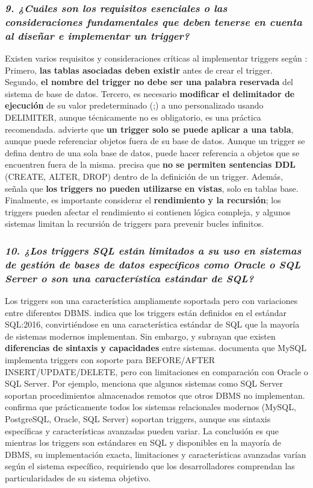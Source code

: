 \subsubsection*{\textit{9. ¿Cuáles son los requisitos esenciales o las consideraciones fundamentales que deben tenerse en cuenta al diseñar e implementar un trigger?}}

Existen varios requisitos y consideraciones críticas al implementar triggers según \parencite{Bosco2020}: Primero, \textbf{las tablas asociadas deben existir} antes de crear el trigger. Segundo, \textbf{el nombre del trigger no debe ser una palabra reservada} del sistema de base de datos. Tercero, es necesario \textbf{modificar el delimitador de ejecución} de su valor predeterminado (;) a uno personalizado usando DELIMITER, aunque técnicamente no es obligatorio, es una práctica recomendada. \parencite{Base100} advierte que \textbf{un trigger solo se puede aplicar a una tabla}, aunque puede referenciar objetos fuera de su base de datos. Aunque un trigger se defina dentro de una sola base de datos, puede hacer referencia a objetos que se encuentren fuera de la misma. \parencite{MySQLDocumentation} precisa que \textbf{no se permiten sentencias DDL} (CREATE, ALTER, DROP) dentro de la definición de un trigger. Además, \parencite{Bosco2020} señala que \textbf{los triggers no pueden utilizarse en vistas}, solo en tablas base. Finalmente, es importante considerar el \textbf{rendimiento y la recursión}; los triggers pueden afectar el rendimiento si contienen lógica compleja, y algunos sistemas limitan la recursión de triggers para prevenir bucles infinitos.

\subsubsection*{\textit{10. ¿Los triggers SQL están limitados a su uso en sistemas de gestión de bases de datos específicos como Oracle o SQL Server o son una característica estándar de SQL?}}

Los triggers son una característica ampliamente soportada pero con variaciones entre diferentes DBMS. \parencite{SQLStandard} indica que los triggers están definidos en el estándar SQL:2016, convirtiéndose en una característica estándar de SQL que la mayoría de sistemas modernos implementan. Sin embargo, \parencite{Bosco2020} y \parencite{Base100} subrayan que existen \textbf{diferencias de sintaxis y capacidades} entre sistemas. \parencite{MySQLDocumentation} documenta que MySQL implementa triggers con soporte para BEFORE/AFTER INSERT/UPDATE/DELETE, pero con limitaciones en comparación con Oracle o SQL Server. Por ejemplo, \parencite{Bosco2020} menciona que algunos sistemas como SQL Server soportan procedimientos almacenados remotos que otros DBMS no implementan. \parencite{Walther2023} confirma que prácticamente todos los sistemas relacionales modernos (MySQL, PostgreSQL, Oracle, SQL Server) soportan triggers, aunque sus sintaxis específicas y características avanzadas pueden variar. La conclusión es que mientras los triggers son estándares en SQL y disponibles en la mayoría de DBMS, su implementación exacta, limitaciones y características avanzadas varían según el sistema específico, requiriendo que los desarrolladores comprendan las particularidades de su sistema objetivo.
